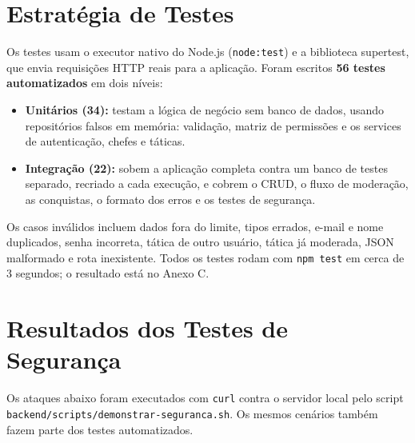\documentclass[12pt,a4paper]{article}
\newcommand{\cod}[1]{\texttt{#1}}
\begin{document}
\section{Estratégia de Testes}

Os testes usam o executor nativo do Node.js (\cod{node:test}) e a biblioteca
supertest, que envia requisições HTTP reais para a aplicação. Foram escritos
\textbf{56 testes automatizados} em dois níveis:

\begin{itemize}
  \item \textbf{Unitários (34):} testam a lógica de negócio sem banco de dados,
  usando repositórios falsos em memória: validação, matriz de permissões e os
  services de autenticação, chefes e táticas.
  \item \textbf{Integração (22):} sobem a aplicação completa contra um banco de
  testes separado, recriado a cada execução, e cobrem o CRUD, o fluxo de
  moderação, as conquistas, o formato dos erros e os testes de segurança.
\end{itemize}

Os casos inválidos incluem dados fora do limite, tipos errados, e-mail e nome
duplicados, senha incorreta, tática de outro usuário, tática já moderada, JSON
malformado e rota inexistente. Todos os testes rodam com \cod{npm test} em cerca
de 3 segundos; o resultado está no Anexo C.

\section{Resultados dos Testes de Segurança}

Os ataques abaixo foram executados com \cod{curl} contra o servidor local pelo
script \cod{backend/scripts/demonstrar-seguranca.sh}. Os mesmos cenários também
fazem parte dos testes automatizados.
\end{document}
